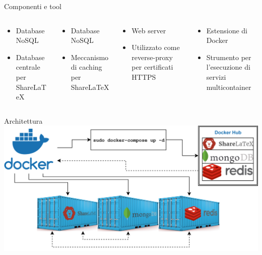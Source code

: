 \documentclass[aspectratio=169]{beamer}
\begin{document}
\begin{frame}{Componenti e tool}
\begin{columns}[T]
\begin{column}{0.25\textwidth}
            \vspace{0.5cm}
        \end{column}
    \end{columns}
    \begin{columns}[T]
        \begin{column}{0.25\textwidth}
            \begin{itemize}
                \item Database NoSQL
                \item Database centrale per ShareLaTeX
            \end{itemize}
        \end{column}
        \begin{column}{0.25\textwidth}
            \begin{itemize}
                \item Database NoSQL
                \item Meccanismo di caching per ShareLaTeX
            \end{itemize}
        \end{column}
        \begin{column}{0.25\textwidth}
            \begin{itemize}
                \item Web server
                \item Utilizzato come reverse-proxy per certificati HTTPS
            \end{itemize}
        \end{column}
        \begin{column}{0.25\textwidth}
            \begin{itemize}
                \item Estensione di Docker
                \item Strumento per l'esecuzione di servizi multicontainer
            \end{itemize}
        \end{column}
    \end{columns}
\end{frame}

\begin{frame}{Architettura}
    \vspace{0.5cm}
    \includegraphics[width=\textwidth]{img/docker_container_dependencies.png}
\end{frame}
\end{document}
